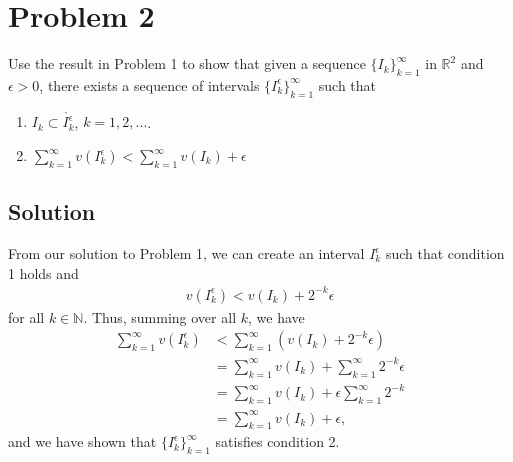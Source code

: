 \documentclass[10pt,a4paper]{article}
\theoremstyle{theorem}
\theoremstyle{definition}
\begin{document}
\section*{Problem 2}
Use the result in Problem 1 to show that given a sequence $\{I_k\}_{k=1}^\infty$ in $\mathbb{R}^2$ and $\epsilon > 0$, there exists a sequence of intervals $\{I_k^\epsilon\}_{k=1}^\infty$ such that 
\begin{enumerate}
\item $I_k \subset \mathring{I_k^\epsilon}$, $k=1,2,...$.
\item $\sum_{k=1}^\infty v(I_k^\epsilon) < \sum_{k=1}^\infty v(I_k) + \epsilon$
\end{enumerate}
\subsection*{Solution}
From our solution to Problem 1, we can create an interval $I_k^\epsilon$ such that condition 1 holds and
\begin{align*}
v(I_k^\epsilon) < v(I_k) + 2^{-k} \epsilon
\end{align*}
for all $k \in \mathbb{N}$. Thus, summing over all $k$, we have
\begin{align*}
\sum_{k=1}^\infty v(I_k^\epsilon) &< \sum_{k=1}^\infty (v(I_k) +  2^{-k} \epsilon)\\
&= \sum_{k=1}^\infty v(I_k) +  \sum_{k=1}^\infty 2^{-k} \epsilon\\
&= \sum_{k=1}^\infty v(I_k) +  \epsilon \sum_{k=1}^\infty 2^{-k} \\
&= \sum_{k=1}^\infty v(I_k) + \epsilon,
\end{align*}
and we have shown that $\{I_k^\epsilon\}_{k=1}^\infty$ satisfies condition 2.
\end{document}
